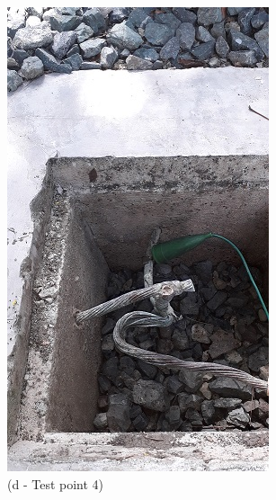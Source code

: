 \begin{figure}
\begin{minipage}[b]{0.22\linewidth}
	\centering
	\includegraphics[width=\textwidth]{figures/R1P_grounding/grounding4.jpg}
	\caption*{(d - Test point 4)}
\end{minipage}
\hspace{0.03cm}
\begin{minipage}[b]{0.22\linewidth}
	\centering

\end{minipage}
\end{figure}
